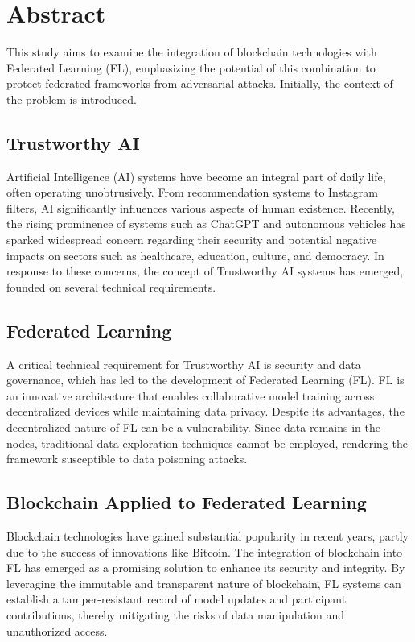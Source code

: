\chapter*{Abstract}
This study aims to examine the integration of blockchain technologies with Federated Learning (FL), emphasizing the potential of this combination to protect federated frameworks from adversarial attacks. Initially, the context of the problem is introduced.

\section*{Trustworthy AI}
Artificial Intelligence (AI) systems have become an integral part of daily life, often operating unobtrusively. From recommendation systems to Instagram filters, AI significantly influences various aspects of human existence. Recently, the rising prominence of systems such as ChatGPT and autonomous vehicles has sparked widespread concern regarding their security and potential negative impacts on sectors such as healthcare, education, culture, and democracy. In response to these concerns, the concept of Trustworthy AI systems has emerged, founded on several technical requirements.

\section*{Federated Learning}
A critical technical requirement for Trustworthy AI is security and data governance, which has led to the development of Federated Learning (FL). FL is an innovative architecture that enables collaborative model training across decentralized devices while maintaining data privacy. Despite its advantages, the decentralized nature of FL can be a vulnerability. Since data remains in the nodes, traditional data exploration techniques cannot be employed, rendering the framework susceptible to data poisoning attacks.

\section*{Blockchain Applied to Federated Learning}
Blockchain technologies have gained substantial popularity in recent years, partly due to the success of innovations like Bitcoin. The integration of blockchain into FL has emerged as a promising solution to enhance its security and integrity. By leveraging the immutable and transparent nature of blockchain, FL systems can establish a tamper-resistant record of model updates and participant contributions, thereby mitigating the risks of data manipulation and unauthorized access.


